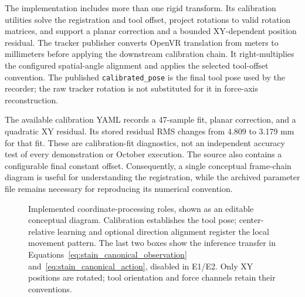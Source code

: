 The implementation includes more than one rigid transform. Its calibration utilities solve the registration and tool offset, project rotations to valid rotation matrices, and support a planar correction and a bounded XY-dependent position residual. The tracker publisher converts OpenVR translation from meters to millimeters before applying the downstream calibration chain. It right-multiplies the configured spatial-angle alignment and applies the selected tool-offset convention. The published \texttt{calibrated\_pose} is the final tool pose used by the recorder; the raw tracker rotation is not substituted for it in force-axis reconstruction.

The available calibration YAML records a 47-sample fit, planar correction, and a quadratic XY residual. Its stored residual RMS changes from 4.809 to 3.179 mm for that fit. These are calibration-fit diagnostics, not an independent accuracy test of every demonstration or October execution. The source also contains a configurable final constant offset. Consequently, a single conceptual frame-chain diagram is useful for understanding the registration, while the archived parameter file remains necessary for reproducing its numerical convention.

\begin{figure}[tbp]\centering
{}
\caption[Coordinate-processing and direction-transfer chain]{Implemented coordinate-processing roles, shown as an editable conceptual diagram. Calibration establishes the tool pose; center-relative learning and optional direction alignment register the local movement pattern. The last two boxes show the inference transfer in Equations~\eqref{eq:stain_canonical_observation} and~\eqref{eq:stain_canonical_action}, disabled in E1/E2. Only XY positions are rotated; tool orientation and force channels retain their conventions.}
\label{fig:demo_transfer}
\end{figure}

